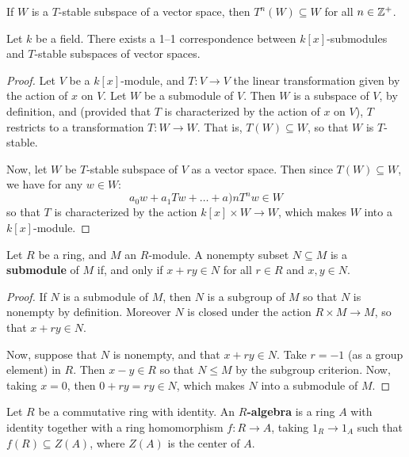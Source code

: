 \begin{definition}
\begin{proposition}\label{proposition_4.1.2}
  If $W$ is a $T$-stable subspace of a vector space, then $T^n(W)
  \subseteq W$ for all $n \in \mathbb{Z}^+$.
\end{proposition}

\begin{proposition}\label{proposition_4.1.3}
  Let $k$ be a field. There exists a 1--1 correspondence between
  $k[x]$-submodules and $T$-stable subspaces of vector spaces.
\end{proposition}
\begin{proof}
  Let $V$ be a $k[x]$-module, and $T:V \xrightarrow{} V$ the linear
  transformation given by the action of $x$ on  $V$. Let  $W$ be a
  submodule of $V$. Then $W$ is a subspace of $V$, by definition, and
  (provided that $T$ is characterized by the action of $x$ on $V$),
  $T$ restricts to a transformation  $T:W \xrightarrow{} W$. That is,
  $T(W) \subseteq W$, so that $W$ is  $T$-stable.

  Now, let $W$ be $T$-stable subspace of $V$ as a vector space. Then
  since $T(W) \subseteq W$, we have for any $w \in W$:
  \begin{equation*}
    a_0w+a_1Tw+\dots+a)nT^nw \in W
  \end{equation*}
  so that $T$ is characterized by the action  $k[x] \times W
  \xrightarrow{} W$, which makes $W$ into a $k[x]$-module.
\end{proof}

\begin{theorem}\label{theorem_4.1.4}
  Let $R$ be a ring, and  $M$ an $R$-module. A nonempty subset $N
  \subseteq M$ is a \textbf{submodule} of $M$ if, and only if  $x+ry
  \in N$ for all $r \in R$ and $x,y \in N$.
\end{theorem}
\begin{proof}
  If $N$ is a submodule of $M$, then $N$ is a subgroup of $M$ so that
  $N$ is nonempty by definition. Moreover $N$ is closed under the
  action $R \times M \xrightarrow{} M$, so that $x+ry \in N$.

  Now, suppose that $N$ is nonempty, and that  $x+ry \in N$. Take
  $r=-1$ (as a group element) in $R$. Then $x-y \in R$ so that $N \leq
  M$ by the subgroup criterion. Now, taking $x=0$, then  $0+ry=ry \in
  N$, which makes $N$ into a submodule of $M$.
\end{proof}

\begin{definition}
  Let $R$ be a commutative ring with identity. An
  \textbf{$R$-algebra} is a ring $A$ with identity together with a
  ring homomorphism $f:R \xrightarrow{} A$, taking $1_R \xrightarrow{}
  1_A$ such that $f(R) \subseteq Z(A)$, where $Z(A)$ is the center of
  $A$.
\end{definition}


\end{definition}
